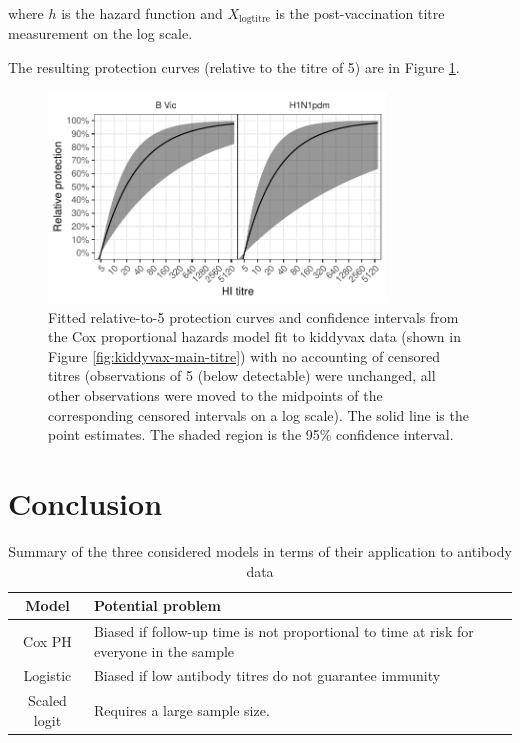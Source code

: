 \documentclass[12pt]{article}
\begin{document}
where $h$ is the hazard function and $X_{\text{logtitre}}$ is the post-vaccination titre measurement on the log scale.

The resulting protection curves (relative to the titre of 5) are in Figure \ref{fig:kiddyvaxmain-cox}.

\begin{figure}[htp]
	\centering
	\includegraphics[width=0.8\textwidth]{../fit-cox-plot/kiddyvaxmain.pdf}
	\caption{
	Fitted relative-to-5 protection curves and confidence intervals from the Cox proportional hazards model fit to kiddyvax data (shown in Figure \ref{fig:kiddyvax-main-titre}) with no accounting of censored titres (observations of 5 (below detectable) were unchanged, all other observations were moved to the midpoints of the corresponding censored intervals on a log scale). The solid line is the point estimates. The shaded region is the 95\% confidence interval.
	}
	\label{fig:kiddyvaxmain-cox}
\end{figure}

\pagebreak
%
\section{Conclusion}

\begin{table}[htp]
\centering
\caption{Summary of the three considered models in terms of their application to antibody data}
\begin{tabular}{cp{25em}}
\toprule
Model & Potential problem \\
\midrule
Cox PH & Biased if follow-up time is not proportional to time at risk for everyone in the sample \\
Logistic & Biased if low antibody titres do not guarantee immunity \\
Scaled logit & Requires a large sample size. \\
\bottomrule
\end{tabular}
\end{table}
\end{document}
